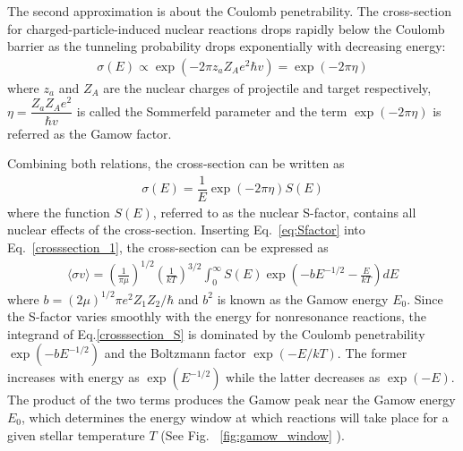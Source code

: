 The second approximation is about the Coulomb penetrability. The cross-section for charged-particle-induced nuclear reactions drops rapidly below the Coulomb barrier as the tunneling probability drops exponentially with decreasing energy:
\begin{equation}
    \begin{aligned}
        \sigma(E) \propto \exp(-2\pi z_a Z_A e^2\hbar v) = \exp (-2\pi \eta)
    \end{aligned}
\end{equation}
where $z_a$ and $Z_A$ are the nuclear charges of projectile and target respectively, $\eta = \dfrac{Z_a Z_A e^2}{\hbar v}$ is called the Sommerfeld parameter and the term $\exp(-2\pi\eta)$ is referred as the Gamow factor.

Combining both relations, the cross-section can be written as
\begin{equation}
    \label{eq:Sfactor}
    \begin{aligned}
        \sigma(E) = \dfrac{1}{E}\exp(-2\pi\eta)S(E)
    \end{aligned}
\end{equation}
where the function $S(E)$, referred to as the nuclear S-factor, contains all   nuclear effects of the cross-section.
Inserting Eq.~\ref{eq:Sfactor} into Eq.~\ref{crosssection_1}, the cross-section can be expressed as
\begin{equation}
    \label{crosssection_S}
    \begin{aligned}
     \langle\sigma v \rangle =(\frac{1}{\pi \mu})^{1/2} (\frac{1}{kT})^{3/2} \int_0^\infty S(E) \exp(-bE^{-1/2}-\frac{E}{kT})dE
    \end{aligned}
\end{equation}
where $b=(2\mu)^{1/2}\pi e^2 Z_1 Z_2/\hbar$ and $b^2$ is known as the Gamow energy $E_0$. Since the S-factor varies smoothly with the energy for nonresonance reactions, the integrand of Eq.\ref{crosssection_S} is dominated by the Coulomb penetrability $\exp(-bE^{-1/2})$
and the Boltzmann factor $\exp(-E/kT)$. The former increases with energy as $\exp(E^{-1/2})$ while the latter decreases as $\exp(-E)$. The product of the two terms produces the Gamow peak near the Gamow energy $E_0$, which determines the energy window at which reactions will take place for a given stellar temperature $T$ (See Fig. ~\ref{fig:gamow_window} ).

